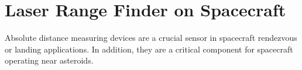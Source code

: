 

\section{Laser Range Finder on Spacecraft}

Absolute distance measuring devices are a crucial sensor in spacecraft rendezvous or landing applications.
In addition, they are a critical component for spacecraft operating near asteroids.




